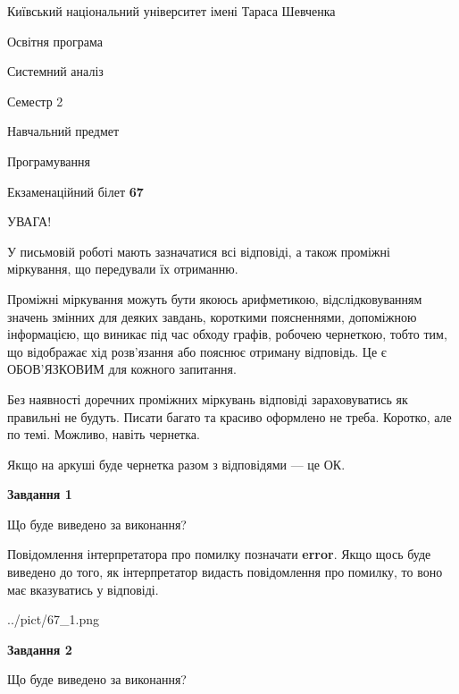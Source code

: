 \documentclass[12pt, ukrainian]{article}
\begin{document}
{{\begin {small}\par
{ \center  Київський національний університет імені Тараса Шевченка \par}
{\parbox {5 cm}{Освітня програма \hfill}{\parbox {7 cm}{Системний аналіз \hfill}}\parbox {6 cm}{\hfill Семестр 2}}\par
{\parbox {5 cm} {Навчальний предмет \hfill}\parbox {7 cm}{Програмування \hfill}\parbox {6cm}{\hfill}\par}\vspace{-7pt} \end{small}}{\center Екзаменаційний білет \No \textbf
{ 67 }\par}}
{
\begin {large}
УВАГА!

У письмовій роботі мають зазначатися всі відповіді, а також проміжні міркування, що передували їх отриманню.

Проміжні міркування можуть бути якоюсь арифметикою, відслідковуванням зна\-чень змінних для деяких завдань,
короткими поясненнями, допоміжною інформацією, що виникає під час обходу графів, робочею чернеткою,
тобто тим, що відображає хід розв’язання або пояснює отриману відповідь.
Це є ОБОВ’ЯЗКОВИМ для кожного запитання.

Без наявності доречних проміжних міркувань відповіді зараховуватись як правиль\-ні не будуть.
Писати багато та красиво оформлено не треба. Коротко, але по темі. Можли\-во, навіть чернетка.

Якщо на аркуші буде чернетка разом з відповідями --- це ОК.

\newpage

{\begin {center}\textbf{Завдання 1}\end {center}}\par
Що буде виведено за виконання?

Повідомлення інтерпретатора про помилку позначати \textbf{error}.
Якщо щось буде виведено до того, як інтерпретатор видасть повідомлення про помилку, 
то воно має вказуватись у відповіді. \par


\begin{center}
	{../pict/67_1.png}
\end{center}
\newpage

{\begin {center}\textbf{Завдання 2}\end {center}}\par
Що буде виведено за виконання?


\end{large}}
\end{document}
